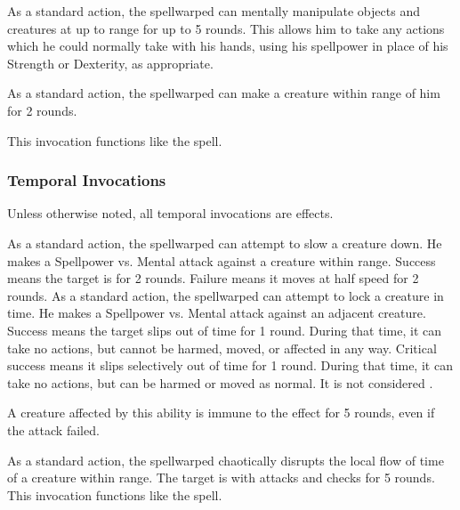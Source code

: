             As a standard action, the spellwarped can mentally manipulate objects and creatures at up to \rngclose range for up to 5 rounds.
            This allows him to take any actions which he could normally take with his hands, using his spellpower in place of his Strength or Dexterity, as appropriate.

            As a standard action, the spellwarped can make a creature within \rngmed range of him \immobilized for 2 rounds.

            This invocation functions like the  spell.

        \subsubsection{Temporal Invocations}
            Unless otherwise noted, all temporal invocations are  effects.

            As a standard action, the spellwarped can attempt to slow a creature down.
            He makes a Spellpower vs. Mental attack against a creature within \rngmed range.
            Success means the target is \immobilized for 2 rounds.
            Failure means it moves at half speed for 2 rounds.
            As a standard action, the spellwarped can attempt to lock a creature in time.
            He makes a Spellpower vs. Mental attack against an adjacent creature.
            Success means the target slips out of time for 1 round.
            During that time, it can take no actions, but cannot be harmed, moved, or affected in any way.
            Critical success means it slips selectively out of time for 1 round.
            During that time, it can take no actions, but can be harmed or moved as normal.
            It is not considered \helpless.
            \par A creature affected by this ability is immune to the effect for 5 rounds, even if the attack failed.

            As a standard action, the spellwarped chaotically disrupts the local flow of time of a creature within \rngclose range.
            The target is \impaired with attacks and checks for 5 rounds.
            This invocation functions like the  spell.

